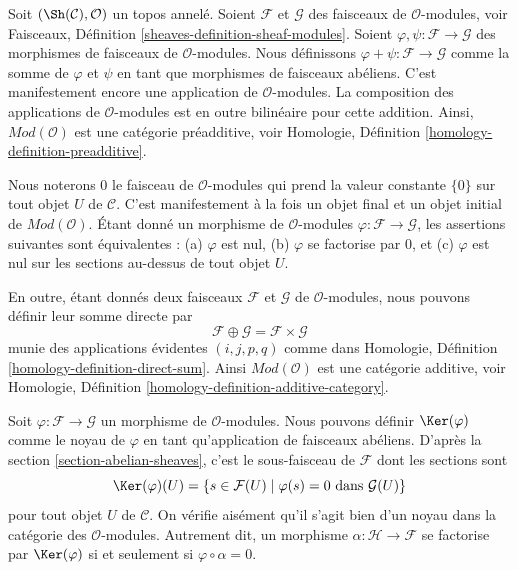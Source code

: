 \noindent
Soit $(\Sh(\mathcal{C}), \mathcal{O})$ un topos annelé. Soient
$\mathcal{F}$ et $\mathcal{G}$ des faisceaux de $\mathcal{O}$-modules, voir
Faisceaux, Définition \ref{sheaves-definition-sheaf-modules}. Soient
$\varphi, \psi : \mathcal{F} \to \mathcal{G}$ des morphismes de faisceaux de
$\mathcal{O}$-modules. Nous définissons
$\varphi + \psi : \mathcal{F} \to \mathcal{G}$ comme la somme de $\varphi$ et
$\psi$ en tant que morphismes de faisceaux abéliens. C'est manifestement encore
une application de $\mathcal{O}$-modules. La composition des applications de
$\mathcal{O}$-modules est en outre bilinéaire pour cette addition. Ainsi,
$\textit{Mod}(\mathcal{O})$ est une catégorie préadditive, voir Homologie,
Définition \ref{homology-definition-preadditive}.

\medskip\noindent
Nous noterons $0$ le faisceau de $\mathcal{O}$-modules qui prend la valeur
constante $\{0\}$ sur tout objet $U$ de $\mathcal{C}$. C'est manifestement à
la fois un objet final et un objet initial de $\textit{Mod}(\mathcal{O})$.
Étant donné un morphisme de $\mathcal{O}$-modules
$\varphi : \mathcal{F} \to \mathcal{G}$, les assertions suivantes sont
équivalentes : (a) $\varphi$ est nul, (b) $\varphi$ se factorise par $0$, et
(c) $\varphi$ est nul sur les sections au-dessus de tout objet $U$.

\medskip\noindent
En outre, étant donnés deux faisceaux $\mathcal{F}$ et $\mathcal{G}$ de
$\mathcal{O}$-modules, nous pouvons définir leur somme directe par
$$
\mathcal{F} \oplus \mathcal{G} = \mathcal{F} \times \mathcal{G}
$$
munie des applications évidentes $(i, j, p, q)$ comme dans Homologie,
Définition \ref{homology-definition-direct-sum}. Ainsi
$\textit{Mod}(\mathcal{O})$ est une catégorie additive, voir Homologie,
Définition \ref{homology-definition-additive-category}.

\medskip\noindent
Soit $\varphi : \mathcal{F} \to \mathcal{G}$ un morphisme de
$\mathcal{O}$-modules. Nous pouvons définir $\Ker(\varphi)$ comme le noyau de
$\varphi$ en tant qu'application de faisceaux abéliens. D'après la section
\ref{section-abelian-sheaves}, c'est le sous-faisceau de $\mathcal{F}$ dont les
sections sont
$$
\Ker(\varphi)(U) =
\{ s \in \mathcal{F}(U) \mid \varphi(s) = 0 \text{ dans } \mathcal{G}(U)\}
$$
pour tout objet $U$ de $\mathcal{C}$. On vérifie aisément qu'il s'agit bien
d'un noyau dans la catégorie des $\mathcal{O}$-modules. Autrement dit, un
morphisme $\alpha : \mathcal{H} \to \mathcal{F}$ se factorise par
$\Ker(\varphi)$ si et seulement si $\varphi \circ \alpha = 0$.

